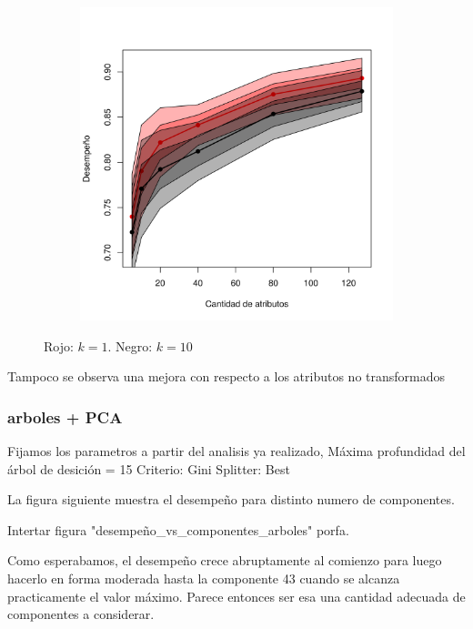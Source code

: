 \documentclass[a4paper,10pt]{article}
\begin{document}
\begin{figure}[H]
  \centering
  \begin{subfigure}[b]{0.4\textwidth}
    \includegraphics[width=\textwidth]{../imagenes/knn}
  \end{subfigure}
  \caption{Rojo: $k=1$. Negro: $k=10$ }
  \label{fig:knn-n_neighbors}
\end{figure}

Tampoco se observa una mejora con respecto a los atributos no transformados

\subsubsection{arboles + PCA}

Fijamos los parametros a partir del analisis ya realizado,
Máxima profundidad del árbol de desición = 15
Criterio: Gini
Splitter: Best

La figura siguiente muestra el desempeño para distinto numero de componentes.

Intertar figura "desempeño_vs_componentes_arboles" porfa.

Como esperabamos, el desempeño crece abruptamente al comienzo para luego hacerlo en forma moderada hasta la componente 43 cuando se alcanza practicamente el valor máximo. Parece entonces ser esa una cantidad adecuada de componentes a considerar.
\end{document}
